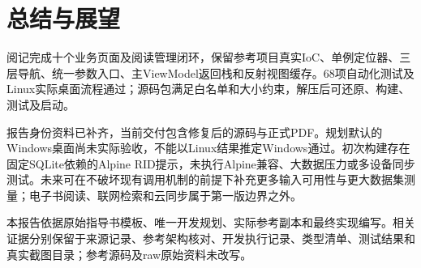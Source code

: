 \documentclass[UTF8,a4paper,11pt,fontset=none]{ctexart}
\begin{document}
\clearpage
\section{总结与展望}
阅记完成十个业务页面及阅读管理闭环，保留参考项目真实IoC、单例定位器、三层导航、统一参数入口、主ViewModel返回栈和反射视图缓存。68项自动化测试及Linux实际桌面流程通过；源码包满足白名单和大小约束，解压后可还原、构建、测试及启动。

报告身份资料已补齐，当前交付包含修复后的源码与正式PDF。规划默认的Windows桌面尚未实际验收，不能以Linux结果推定Windows通过。初次构建存在固定SQLite依赖的Alpine RID提示，未执行Alpine兼容、大数据压力或多设备同步测试。未来可在不破坏现有调用机制的前提下补充更多输入可用性与更大数据集测量；电子书阅读、联网检索和云同步属于第一版边界之外。

本报告依据原始指导书模板、唯一开发规划、实际参考副本和最终实现编写。相关证据分别保留于来源记录、参考架构核对、开发执行记录、类型清单、测试结果和真实截图目录；参考源码及raw原始资料未改写。
\end{document}
